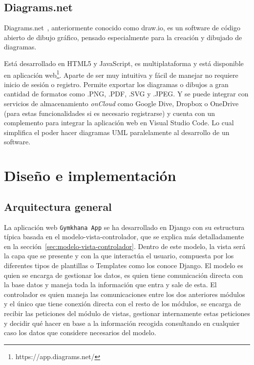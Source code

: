 \documentclass[a4paper, 12pt]{book}
\begin{document}
\section{Diagrams.net}
Diagrams.net~\cite{diagrams.net}, anteriormente conocido como draw.io, es un software de código abierto de dibujo gráfico, pensado especialmente para la creación y dibujado de diagramas.

Está desarrollado en HTML5 y JavaScript, es multiplataforma y está disponible en aplicación web\footnote{https://app.diagrams.net/}. Aparte de ser muy intuitiva y fácil de manejar no requiere inicio de sesión o registro. Permite exportar los diagramas o dibujos a gran cantidad de formatos como .PNG, .PDF, .SVG y .JPEG. Y se puede integrar con servicios de almacenamiento \emph{onCloud} como Google Dive, Dropbox o OneDrive (para estas funcionalidades si es necesario registrarse) y cuenta con un complemento para integrar la aplicación web en Visual Studio Code. Lo cual simplifica el poder hacer diagramas UML paralelamente al desarrollo de un software.



\chapter{Diseño e implementación}
\label{chap:diseño}


\section{Arquitectura general} 
\label{sec:arquitectura}

La aplicación web \texttt{Gymkhana App} se ha desarrollado en Django con su estructura típica basada en el modelo-vista-controlador, que se explica más detalladamente en la sección~\ref{sec:modelo-vista-controlador}. Dentro de este modelo, la vista será la capa que se presente y con la que interactúa el usuario, compuesta por los diferentes tipos de plantillas o Templates como los conoce Django. El modelo es quien se encarga de gestionar los datos, es quien tiene comunicación directa con la base datos y maneja toda la información que entra y sale de esta. El controlador es quien maneja las comunicaciones entre los dos anteriores módulos y el único que tiene conexión directa con el resto de los módulos, se encarga de recibir las peticiones del módulo de vistas, gestionar internamente estas peticiones y decidir qué hacer en base a la información recogida consultando en cualquier caso los datos que considere necesarios del modelo. 
\end{document}

